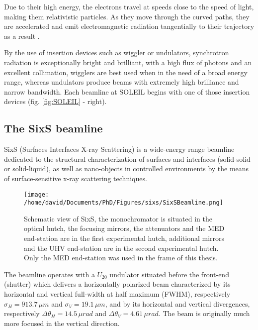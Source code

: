 Due to their high energy, the electrons travel at speeds close to the speed of light, making them relativistic particles.
As they move through the curved paths, they are accelerated and emit electromagnetic radiation tangentially to their trajectory as a result \parencite{Willmott, NielsenMcMorrow}.

By the use of insertion devices such as wiggler or undulators, synchrotron radiation is exceptionally bright and brilliant, with a high flux of photons and an excellent collimation, wigglers are best used when in the need of a broad energy range, whereas undulators produce beams with extremely high brilliance and narrow bandwidth.
Each beamline at SOLEIL begins with one of those insertion devices (fig. \ref{fig:SOLEIL} - right).

\subsection{The SixS beamline}

SixS (Surfaces Interfaces X-ray Scattering) is a wide-energy range beamline dedicated to the structural characterization of surfaces and interfaces (solid-solid or solid-liquid), as well as nano-objects in controlled environments by the means of surface-sensitive x-ray scattering techniques.

\begin{figure}[!htb]
    \centering
    \texttt{[image: /home/david/Documents/PhD/Figures/sixs/SixSBeamline.png]}
    \caption{
		Schematic view of SixS, the monochromator is situated in the optical hutch, the focusing mirrors, the attenuators and the MED end-station are in the first experimental hutch, additional mirrors and the UHV end-station are in the second experimental hutch.
		Only the MED end-station was used in the frame of this thesis.
    }
    \label{fig:SixSBeamline}
\end{figure}

The beamline operates with a $U_{20}$ undulator situated before the front-end (shutter) which delivers a horizontally polarized beam characterized by its horizontal and vertical full-width at half maximum (FWHM), respectively $\sigma_H = 913.7 \, \mu m$ and $\sigma_V = 19.1 \, \mu m$, and by its horizontal and vertical divergences, respectively $\Delta\theta_H = 14.5 \, \mu rad$ and $\Delta\theta_V = 4.61 \, \mu rad$.
The beam is originally much more focused in the vertical direction.

